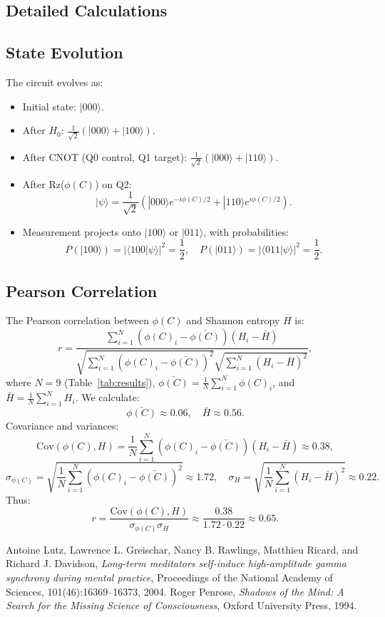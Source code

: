 \documentclass[a4paper,12pt]{article}
\begin{document}
\begin{appendix}
\section{Detailed Calculations}
\subsection{State Evolution}\label{app:state}
The circuit evolves as:
\begin{itemize}
    \item Initial state: $|000\rangle$.
    \item After $H_0$: $\frac{1}{\sqrt{2}}(|000\rangle + |100\rangle)$.
    \item After CNOT (Q0 control, Q1 target): $\frac{1}{\sqrt{2}}(|000\rangle + |110\rangle)$.
    \item After Rz($\phi(C)$) on Q2:
    \[
    |\psi\rangle = \frac{1}{\sqrt{2}} \left( |000\rangle e^{-i\phi(C)/2} + |110\rangle e^{i\phi(C)/2} \right).
    \]
    \item Measurement projects onto $|100\rangle$ or $|011\rangle$, with probabilities:
    \[
    P(|100\rangle) = \left| \langle 100 | \psi \rangle \right|^2 = \frac{1}{2}, \quad P(|011\rangle) = \left| \langle 011 | \psi \rangle \right|^2 = \frac{1}{2}.
    \]
\end{itemize}

\subsection{Pearson Correlation}\label{app:pearson}
The Pearson correlation between $\phi(C)$ and Shannon entropy $H$ is:
\[
r = \frac{\sum_{i=1}^N (\phi(C)_i - \bar{\phi(C)})(H_i - \bar{H})}{\sqrt{\sum_{i=1}^N (\phi(C)_i - \bar{\phi(C)})^2} \sqrt{\sum_{i=1}^N (H_i - \bar{H})^2}},
\]
where $N=9$ (Table~\ref{tab:results}), $\bar{\phi(C)} = \frac{1}{N} \sum_{i=1}^N \phi(C)_i$, and $\bar{H} = \frac{1}{N} \sum_{i=1}^N H_i$. We calculate:
\[
\bar{\phi(C)} \approx 0.06, \quad \bar{H} \approx 0.56.
\]
Covariance and variances:
\[
\text{Cov}(\phi(C), H) = \frac{1}{N} \sum_{i=1}^N (\phi(C)_i - \bar{\phi(C)})(H_i - \bar{H}) \approx 0.38,
\]
\[
\sigma_{\phi(C)} = \sqrt{\frac{1}{N} \sum_{i=1}^N (\phi(C)_i - \bar{\phi(C)})^2} \approx 1.72, \quad \sigma_H = \sqrt{\frac{1}{N} \sum_{i=1}^N (H_i - \bar{H})^2} \approx 0.22.
\]
Thus:
\[
r = \frac{\text{Cov}(\phi(C), H)}{\sigma_{\phi(C)} \sigma_H} \approx \frac{0.38}{1.72 \cdot 0.22} \approx 0.65.
\]
\end{appendix}

\begin{thebibliography}{9}
Antoine Lutz, Lawrence L. Greischar, Nancy B. Rawlings, Matthieu Ricard, and Richard J. Davidson, 
\emph{Long-term meditators self-induce high-amplitude gamma synchrony during mental practice}, 
Proceedings of the National Academy of Sciences, 101(46):16369--16373, 2004.
Roger Penrose, 
\emph{Shadows of the Mind: A Search for the Missing Science of Consciousness}, 
Oxford University Press, 1994.
\end{thebibliography}
\end{document}

